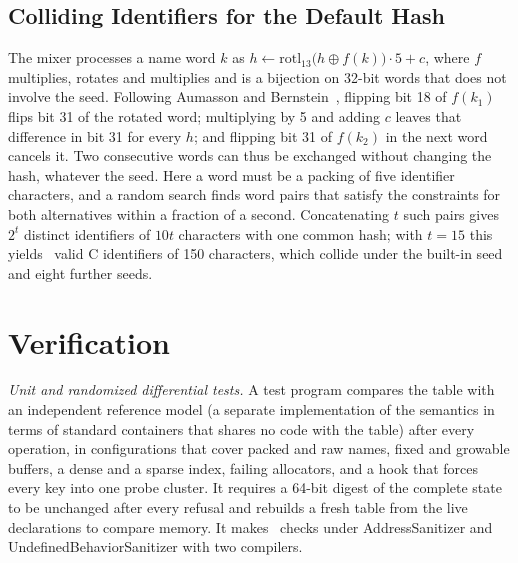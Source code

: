 \subsection{Colliding Identifiers for the Default Hash}
\label{sec:attack}
The mixer processes a name word $k$ as $h \leftarrow \mathrm{rotl}_{13}\bigl(h \oplus f(k)\bigr)\cdot 5 + c$, where $f$ multiplies, rotates and multiplies and is a bijection on 32-bit words that does not involve the seed. Following Aumasson and Bernstein~\cite{aumasson2012,aumassonslides}, flipping bit 18 of $f(k_1)$ flips bit 31 of the rotated word; multiplying by 5 and adding $c$ leaves that difference in bit 31 for every $h$; and flipping bit 31 of $f(k_2)$ in the next word cancels it. Two consecutive words can thus be exchanged without changing the hash, whatever the seed. Here a word must be a packing of five identifier characters, and a random search finds word pairs that satisfy the constraints for both alternatives within a fraction of a second. Concatenating $t$ such pairs gives $2^{t}$ distinct identifiers of $10t$ characters with one common hash; with $t=15$ this yields \FloodN\ valid C identifiers of 150 characters, which collide under the built-in seed and eight further seeds.

\section{Verification}
\label{sec:verification}
\emph{Unit and randomized differential tests.} A test program compares the table with an independent reference model (a separate implementation of the semantics in terms of standard containers that shares no code with the table) after every operation, in configurations that cover packed and raw names, fixed and growable buffers, a dense and a sparse index, failing allocators, and a hook that forces every key into one probe cluster. It requires a 64-bit digest of the complete state to be unchanged after every refusal and rebuilds a fresh table from the live declarations to compare memory. It makes \UnitChecks\ checks under AddressSanitizer and UndefinedBehaviorSanitizer with two compilers.

